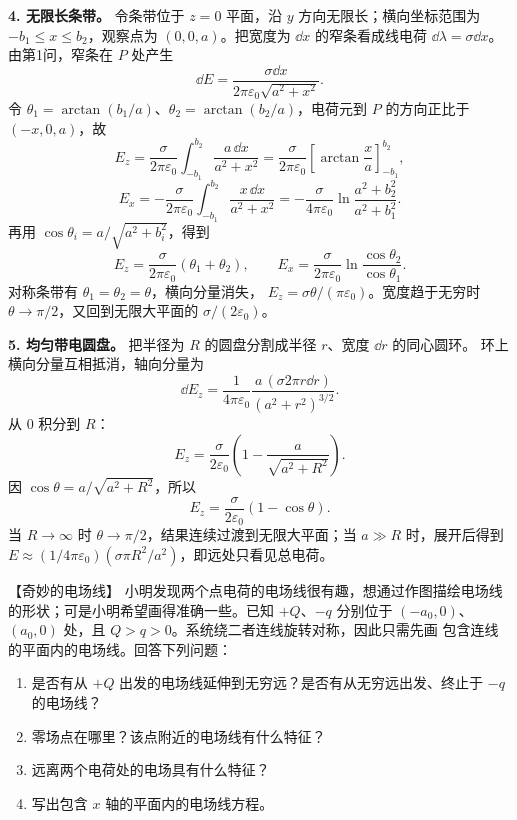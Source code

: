\begin{xesolution}
\textbf{4. 无限长条带。} 令条带位于 $z=0$ 平面，沿 $y$ 方向无限长；横向坐标范围为
$-b_1\le x\le b_2$，观察点为 $(0,0,a)$。把宽度为 $\dd x$ 的窄条看成线电荷
$\dd\lambda=\sigma\dd x$。由第1问，窄条在 $P$ 处产生
\[
  \dd E=\frac{\sigma\dd x}{2\pi\varepsilon_0\sqrt{a^2+x^2}}.
\]
令 $\theta_1=\arctan(b_1/a)$、$\theta_2=\arctan(b_2/a)$，电荷元到 $P$ 的方向正比于 $(-x,0,a)$，故
\[
 E_z=\frac{\sigma}{2\pi\varepsilon_0}\int_{-b_1}^{b_2}\frac{a\,\dd x}{a^2+x^2}
 =\frac{\sigma}{2\pi\varepsilon_0}\left[\arctan\frac xa\right]_{-b_1}^{b_2},
\]
\[
 E_x=-\frac{\sigma}{2\pi\varepsilon_0}\int_{-b_1}^{b_2}\frac{x\,\dd x}{a^2+x^2}
 =-\frac{\sigma}{4\pi\varepsilon_0}\ln\frac{a^2+b_2^2}{a^2+b_1^2}.
\]
再用 $\cos\theta_i=a/\sqrt{a^2+b_i^2}$，得到
\[
  \boxed{E_z=\frac{\sigma}{2\pi\varepsilon_0}(\theta_1+\theta_2)},
  \qquad
  \boxed{E_x=\frac{\sigma}{2\pi\varepsilon_0}
  \ln\frac{\cos\theta_2}{\cos\theta_1}}.
\]
对称条带有 $\theta_1=\theta_2=\theta$，横向分量消失，
$E_z=\sigma\theta/(\pi\varepsilon_0)$。宽度趋于无穷时 $\theta\to\pi/2$，又回到无限大平面的
$\sigma/(2\varepsilon_0)$。

\textbf{5. 均匀带电圆盘。} 把半径为 $R$ 的圆盘分割成半径 $r$、宽度 $\dd r$ 的同心圆环。
环上横向分量互相抵消，轴向分量为
\[
  \dd E_z=\frac{1}{4\pi\varepsilon_0}
  \frac{a\,(\sigma 2\pi r\dd r)}{(a^2+r^2)^{3/2}}.
\]
从 $0$ 积分到 $R$：
\[
  E_z=\frac{\sigma}{2\varepsilon_0}
  \left(1-\frac{a}{\sqrt{a^2+R^2}}\right).
\]
因 $\cos\theta=a/\sqrt{a^2+R^2}$，所以
\[
  \boxed{E_z=\frac{\sigma}{2\varepsilon_0}(1-\cos\theta)}.
\]
当 $R\to\infty$ 时 $\theta\to\pi/2$，结果连续过渡到无限大平面；当 $a\gg R$ 时，展开后得到
$E\approx(1/4\pi\varepsilon_0)(\sigma\pi R^2/a^2)$，即远处只看见总电荷。
\end{xesolution}



\begin{origexamplebox}{【奇妙的电场线】}\label{ch19:ex:s32-1-2}
小明发现两个点电荷的电场线很有趣，想通过作图描绘电场线的形状；可是小明希望画得准确一些。已知
$+Q$、$-q$ 分别位于 $(-a_0,0)$、$(a_0,0)$ 处，且 $Q>q>0$。系统绕二者连线旋转对称，因此只需先画
包含连线的平面内的电场线。回答下列问题：
\begin{enumerate}[label=\arabic*.]
  \item 是否有从 $+Q$ 出发的电场线延伸到无穷远？是否有从无穷远出发、终止于 $-q$ 的电场线？
  \item 零场点在哪里？该点附近的电场线有什么特征？
  \item 远离两个电荷处的电场具有什么特征？
  \item 写出包含 $x$ 轴的平面内的电场线方程。
\end{enumerate}

\ThQUnequalCharges
\end{origexamplebox}\par\nopagebreak[4]

